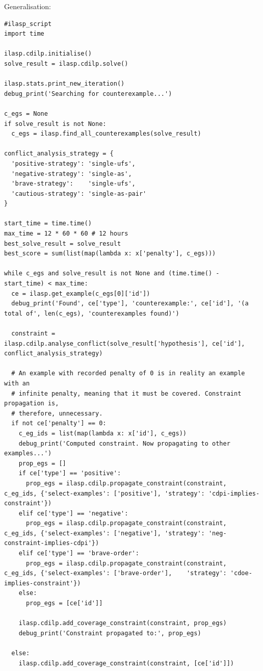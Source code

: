 Generalisation:
\begin{lstlisting}
#ilasp_script
import time

ilasp.cdilp.initialise()
solve_result = ilasp.cdilp.solve()

ilasp.stats.print_new_iteration()
debug_print('Searching for counterexample...')

c_egs = None
if solve_result is not None:
  c_egs = ilasp.find_all_counterexamples(solve_result)

conflict_analysis_strategy = {
  'positive-strategy': 'single-ufs',
  'negative-strategy': 'single-as',
  'brave-strategy':    'single-ufs',
  'cautious-strategy': 'single-as-pair'
}

start_time = time.time()
max_time = 12 * 60 * 60 # 12 hours
best_solve_result = solve_result
best_score = sum(list(map(lambda x: x['penalty'], c_egs)))

while c_egs and solve_result is not None and (time.time() - start_time) < max_time:
  ce = ilasp.get_example(c_egs[0]['id'])
  debug_print('Found', ce['type'], 'counterexample:', ce['id'], '(a total of', len(c_egs), 'counterexamples found)')

  constraint = ilasp.cdilp.analyse_conflict(solve_result['hypothesis'], ce['id'], conflict_analysis_strategy)

  # An example with recorded penalty of 0 is in reality an example with an
  # infinite penalty, meaning that it must be covered. Constraint propagation is,
  # therefore, unnecessary.
  if not ce['penalty'] == 0:
    c_eg_ids = list(map(lambda x: x['id'], c_egs))
    debug_print('Computed constraint. Now propagating to other examples...')
    prop_egs = []
    if ce['type'] == 'positive':
      prop_egs = ilasp.cdilp.propagate_constraint(constraint, c_eg_ids, {'select-examples': ['positive'], 'strategy': 'cdpi-implies-constraint'})
    elif ce['type'] == 'negative':
      prop_egs = ilasp.cdilp.propagate_constraint(constraint, c_eg_ids, {'select-examples': ['negative'], 'strategy': 'neg-constraint-implies-cdpi'})
    elif ce['type'] == 'brave-order':
      prop_egs = ilasp.cdilp.propagate_constraint(constraint, c_eg_ids, {'select-examples': ['brave-order'],    'strategy': 'cdoe-implies-constraint'})
    else:
      prop_egs = [ce['id']]

    ilasp.cdilp.add_coverage_constraint(constraint, prop_egs)
    debug_print('Constraint propagated to:', prop_egs)

  else:
    ilasp.cdilp.add_coverage_constraint(constraint, [ce['id']])


\end{lstlisting}
